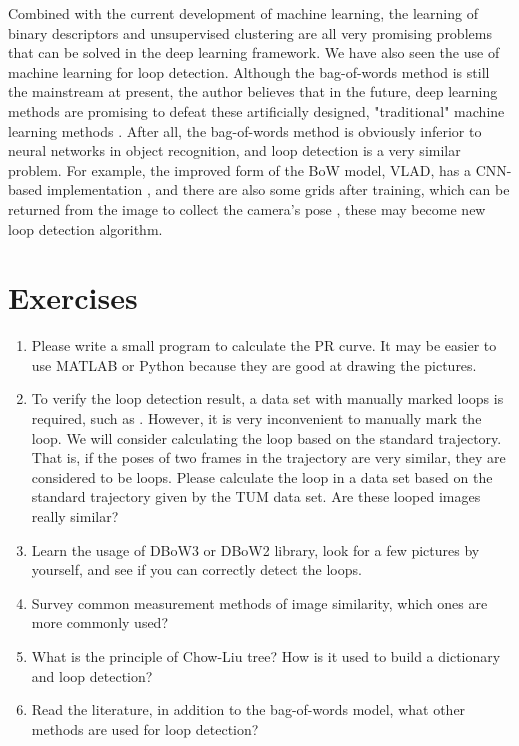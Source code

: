 Combined with the current development of machine learning, the learning of binary descriptors and unsupervised clustering are all very promising problems that can be solved in the deep learning framework. We have also seen the use of machine learning for loop detection. Although the bag-of-words method is still the mainstream at present, the author believes that in the future, deep learning methods are promising to defeat these artificially designed, "traditional" machine learning methods {\cite{Gao2015, Gao2015b}}. After all, the bag-of-words method is obviously inferior to neural networks in object recognition, and loop detection is a very similar problem. For example, the improved form of the BoW model, VLAD, has a CNN-based implementation \cite{Arandjelovic2016,AngelinaUy2018}, and there are also some grids after training, which can be returned from the image to collect the camera's pose \cite{Kendall2015}, these may become new loop detection algorithm.

\section*{Exercises}
\begin{enumerate}
	\item Please write a small program to calculate the PR curve. It may be easier to use MATLAB or Python because they are good at drawing the pictures.
	\item To verify the loop detection result, a data set with manually marked loops is required, such as \cite{Cummins2008}. However, it is very inconvenient to manually mark the loop. We will consider calculating the loop based on the standard trajectory. That is, if the poses of two frames in the trajectory are very similar, they are considered to be loops. Please calculate the loop in a data set based on the standard trajectory given by the TUM data set. Are these looped images really similar?
	\item Learn the usage of DBoW3 or DBoW2 library, look for a few pictures by yourself, and see if you can correctly detect the loops.
	\item Survey  common measurement methods of image similarity, which ones are more commonly used?
	\item What is the principle of Chow-Liu tree? How is it used to build a dictionary and loop detection?
	\item Read the literature\cite{Williams2009}, in addition to the bag-of-words model, what other methods are used for loop detection?
\end{enumerate}
